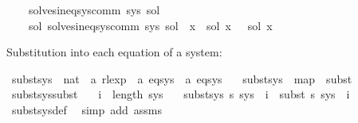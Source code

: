 \begin{isabellebody}
\ \ \ \ solves{\isacharunderscore}{\kern0pt}ineq{\isacharunderscore}{\kern0pt}sys{\isacharunderscore}{\kern0pt}comm\ sys\ sol\ {\isasymand}\isanewline
\ \ \ \ {\isacharparenleft}{\kern0pt}{\isasymforall}sol{\isacharprime}{\kern0pt}{\isachardot}{\kern0pt}\ solves{\isacharunderscore}{\kern0pt}ineq{\isacharunderscore}{\kern0pt}sys{\isacharunderscore}{\kern0pt}comm\ sys\ sol{\isacharprime}{\kern0pt}\ {\isasymlongrightarrow}\ {\isacharparenleft}{\kern0pt}{\isasymforall}x{\isachardot}{\kern0pt}\ {\isasymPsi}\ {\isacharparenleft}{\kern0pt}sol\ x{\isacharparenright}{\kern0pt}\ {\isasymsubseteq}\ {\isasymPsi}\ {\isacharparenleft}{\kern0pt}sol{\isacharprime}{\kern0pt}\ x{\isacharparenright}{\kern0pt}{\isacharparenright}{\kern0pt}{\isacharparenright}{\kern0pt}{\isachardoublequoteclose}%
\begin{isamarkuptext}%
Substitution into each equation of a system:%
\end{isamarkuptext}\isamarkuptrue%
\isamarkupfalse%
\ subst{\isacharunderscore}{\kern0pt}sys\ {\isacharcolon}{\kern0pt}{\isacharcolon}{\kern0pt}\ {\isachardoublequoteopen}{\isacharparenleft}{\kern0pt}nat\ {\isasymRightarrow}\ {\isacharprime}{\kern0pt}a\ rlexp{\isacharparenright}{\kern0pt}\ {\isasymRightarrow}\ {\isacharprime}{\kern0pt}a\ eq{\isacharunderscore}{\kern0pt}sys\ {\isasymRightarrow}\ {\isacharprime}{\kern0pt}a\ eq{\isacharunderscore}{\kern0pt}sys{\isachardoublequoteclose}\ \isanewline
\ \ {\isachardoublequoteopen}subst{\isacharunderscore}{\kern0pt}sys\ {\isasymequiv}\ map\ {\isasymcirc}\ subst{\isachardoublequoteclose}\isanewline
\isanewline
{}\isamarkupfalse%
\ subst{\isacharunderscore}{\kern0pt}sys{\isacharunderscore}{\kern0pt}subst{\isacharcolon}{\kern0pt}\isanewline
\ \ \ {\isachardoublequoteopen}i\ {\isacharless}{\kern0pt}\ length\ sys{\isachardoublequoteclose}\isanewline
\ \ \ {\isachardoublequoteopen}{\isacharparenleft}{\kern0pt}subst{\isacharunderscore}{\kern0pt}sys\ s\ sys{\isacharparenright}{\kern0pt}\ {\isacharbang}{\kern0pt}\ i\ {\isacharequal}{\kern0pt}\ subst\ s\ {\isacharparenleft}{\kern0pt}sys\ {\isacharbang}{\kern0pt}\ i{\isacharparenright}{\kern0pt}{\isachardoublequoteclose}\isanewline
%
\isadelimproof
\ \ %
\endisadelimproof
%
\isatagproof
{}\isamarkupfalse%
\ subst{\isacharunderscore}{\kern0pt}sys{\isacharunderscore}{\kern0pt}def\ \isamarkupfalse%
\ {\isacharparenleft}{\kern0pt}simp\ add{\isacharcolon}{\kern0pt}\ assms{\isacharparenright}{\kern0pt}%
\endisatagproof

\end{isabellebody}
